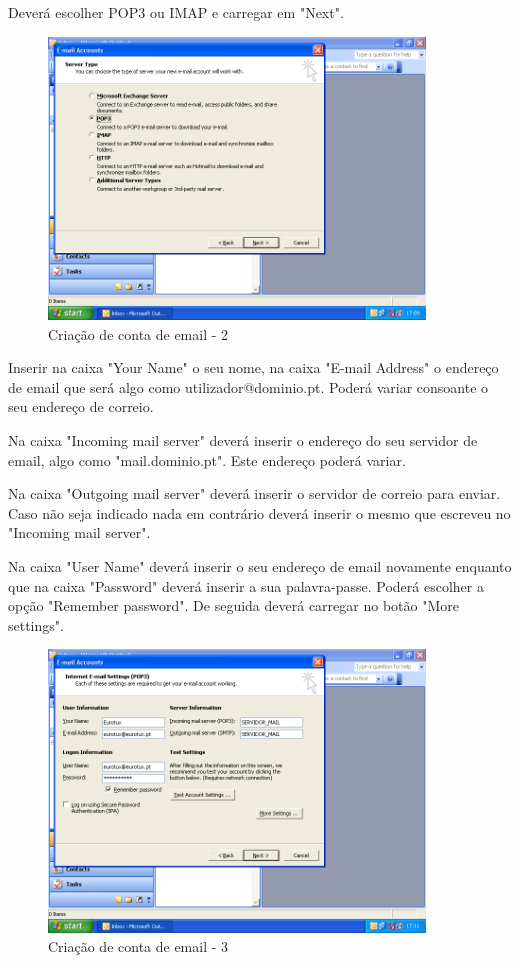 Deverá escolher POP3 ou IMAP e carregar em "Next".

\begin{figure}[H]
    \begin{center}
        \includegraphics[width=10cm]{include/img/outlook2003_3}
    \end{center}
    \caption{Criação de conta de email - 2}
    \label{fig:OUTLK2k34}
\end{figure}

Inserir na caixa "Your Name" o seu nome, na caixa "E-mail Address" o endereço de email que será algo como utilizador@dominio.pt. Poderá variar consoante o seu endereço de correio.

Na caixa "Incoming mail server" deverá inserir o endereço do seu servidor de email, algo como "mail.dominio.pt". Este endereço poderá variar.

Na caixa "Outgoing mail server" deverá inserir o servidor de correio para enviar. Caso não seja indicado nada em contrário deverá inserir o mesmo que escreveu no "Incoming mail server".

Na caixa "User Name" deverá inserir o seu endereço de email novamente enquanto que na caixa "Password" deverá inserir a sua palavra-passe. Poderá escolher a opção "Remember password". De seguida deverá carregar no botão "More settings".

\begin{figure}[H]
    \begin{center}
        \includegraphics[width=10cm]{include/img/outlook2003_4}
    \end{center}
    \caption{Criação de conta de email - 3}
    \label{fig:OUTLK2k35}
\end{figure}

